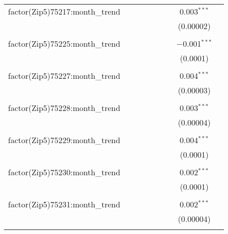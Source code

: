 \begin{table}[H]
{\begin{tabular}{@{\extracolsep{5pt}}lcccccccc}
  factor(Zip5)75217:month\_trend &  &  &  &  &  &  & 0.003$^{***}$ &  \\  

   &  &  &  &  &  &  & (0.00002) &  \\  

   & & & & & & & & \\  

  factor(Zip5)75225:month\_trend &  &  &  &  &  &  & $-$0.001$^{***}$ &  \\  

   &  &  &  &  &  &  & (0.0001) &  \\  

   & & & & & & & & \\  

  factor(Zip5)75227:month\_trend &  &  &  &  &  &  & 0.004$^{***}$ &  \\  

   &  &  &  &  &  &  & (0.00003) &  \\  

   & & & & & & & & \\  

  factor(Zip5)75228:month\_trend &  &  &  &  &  &  & 0.003$^{***}$ &  \\  

   &  &  &  &  &  &  & (0.00004) &  \\  

   & & & & & & & & \\  

  factor(Zip5)75229:month\_trend &  &  &  &  &  &  & 0.004$^{***}$ &  \\  

   &  &  &  &  &  &  & (0.0001) &  \\  

   & & & & & & & & \\  

  factor(Zip5)75230:month\_trend &  &  &  &  &  &  & 0.002$^{***}$ &  \\  

   &  &  &  &  &  &  & (0.0001) &  \\  

   & & & & & & & & \\  

  factor(Zip5)75231:month\_trend &  &  &  &  &  &  & 0.002$^{***}$ &  \\  

   &  &  &  &  &  &  & (0.00004) &  \\  

   & & & & & & & & \\  


\end{tabular}}
\end{table}
